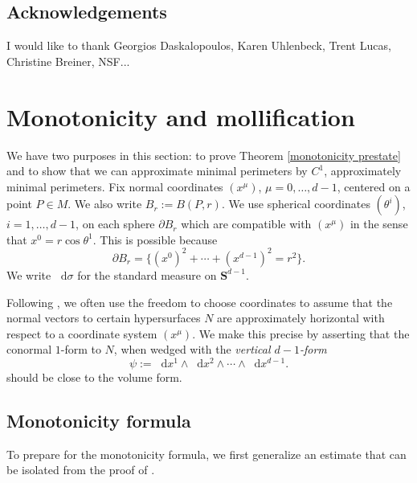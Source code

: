 \documentclass[reqno,10pt]{amsart}
\newcommand{\Sph}{\mathbf S}
\newcommand*\dif{\mathop{}\!\mathrm{d}}
\newcommand{\dfn}[1]{\emph{#1}\index{#1}}
\theoremstyle{definition}
\numberwithin{equation}{section}
\begin{document}

\subsection{Acknowledgements}
I would like to thank Georgios Daskalopoulos, Karen Uhlenbeck, Trent Lucas, Christine Breiner, NSF...





\section{Monotonicity and mollification}\label{MollifierSection}
We have two purposes in this section: to prove Theorem \ref{monotonicity prestate} and to show that we can approximate minimal perimeters by $C^1$, approximately minimal perimeters.
Fix normal coordinates $(x^\mu)$, $\mu = 0, \dots, d - 1$, centered on a point $P \in M$.
We also write $B_r := B(P, r)$.
We use spherical coordinates $(\theta^i)$, $i = 1, \dots, d - 1$, on each sphere $\partial B_r$ which are compatible with $(x^\mu)$ in the sense that $x^0 = r \cos \theta^1$.
This is possible because
\begin{equation}\label{partial Br is a variety}
\partial B_r = \{(x^0)^2 + \cdots + (x^{d - 1})^2 = r^2\}.
\end{equation}
We write $\dif \sigma$ for the standard measure on $\Sph^{d - 1}$.

Following \cite{Giusti77}, we often use the freedom to choose coordinates to assume that the normal vectors to certain hypersurfaces $N$ are approximately horizontal with respect to a coordinate system $(x^\mu)$.
We make this precise by asserting that the conormal $1$-form to $N$, when wedged with the \dfn{vertical $d-1$-form}
\begin{equation}\label{d1 form}
\psi := \dif x^1 \wedge \dif x^2 \wedge \cdots \wedge \dif x^{d - 1}.
\end{equation}
should be close to the volume form.

\subsection{Monotonicity formula}
To prepare for the monotonicity formula, we first generalize an estimate that can be isolated from the proof of \cite[Lemma 5.8]{Giusti77}.
\end{document}
